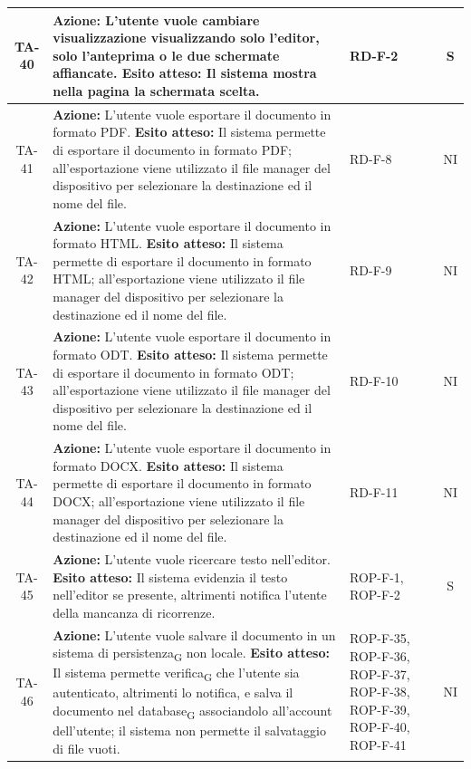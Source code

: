 \documentclass[11pt,a4paper]{article}
\newcommand{\gls}[1]{#1\textsubscript{G}}
\begin{document}
\begin{longtable}{|c|p{9cm}|p{3cm}|c|}
\hline
TA-40 & \textbf{Azione:} L'utente vuole cambiare visualizzazione visualizzando solo l'editor, solo l'anteprima o le due schermate affiancate. \newline \textbf{Esito atteso:} Il sistema mostra nella pagina la schermata scelta. & RD-F-2 & S \\
\hline
TA-41 & \textbf{Azione:} L'utente vuole esportare il documento in formato PDF. \newline \textbf{Esito atteso:} Il sistema permette di esportare il documento in formato PDF; all'esportazione viene utilizzato il file manager del dispositivo per selezionare la destinazione ed il nome del file. & RD-F-8 & NI \\
\hline
TA-42 & \textbf{Azione:} L'utente vuole esportare il documento in formato HTML. \newline \textbf{Esito atteso:} Il sistema permette di esportare il documento in formato HTML; all'esportazione viene utilizzato il file manager del dispositivo per selezionare la destinazione ed il nome del file. & RD-F-9 & NI \\
\hline
TA-43 & \textbf{Azione:} L'utente vuole esportare il documento in formato ODT. \newline \textbf{Esito atteso:} Il sistema permette di esportare il documento in formato ODT; all'esportazione viene utilizzato il file manager del dispositivo per selezionare la destinazione ed il nome del file. & RD-F-10 & NI \\
\hline
TA-44 & \textbf{Azione:} L'utente vuole esportare il documento in formato DOCX. \newline \textbf{Esito atteso:} Il sistema permette di esportare il documento in formato DOCX; all'esportazione viene utilizzato il file manager del dispositivo per selezionare la destinazione ed il nome del file. & RD-F-11 & NI \\
\hline
TA-45 & \textbf{Azione:} L'utente vuole ricercare testo nell'editor. \newline \textbf{Esito atteso:} Il sistema evidenzia il testo nell'editor se presente, altrimenti notifica l'utente della mancanza di ricorrenze. & ROP-F-1, ROP-F-2 & S \\
\hline
TA-46 & \textbf{Azione:} L'utente vuole salvare il documento in un \gls{sistema di persistenza} non locale. \newline \textbf{Esito atteso:} Il sistema permette \gls{verifica} che l'utente sia autenticato, altrimenti lo notifica, e salva il documento nel \gls{database} associandolo all'account dell'utente; il sistema non permette il salvataggio di file vuoti. & ROP-F-35, ROP-F-36, ROP-F-37, ROP-F-38, ROP-F-39, ROP-F-40, ROP-F-41  & NI \\

\end{longtable}
\end{document}
